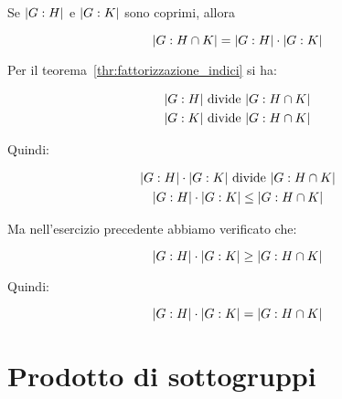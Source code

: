 \begin{teorema}
	Se $\lvert G:H \rvert$ e $\lvert G:K \rvert$ sono coprimi, allora
	
	\begin{equation}
		\lvert G:H \cap K \rvert = \lvert G:H \rvert \cdot \lvert G:K \rvert
	\end{equation}
\end{teorema}
\begin{dimostrazione}
	Per il teorema~\ref{thr:fattorizzazione_indici} si ha:
	
	\begin{gather}
		\lvert G:H \rvert \text{ divide } \lvert G:H \cap K \rvert \\
		\lvert G:K \rvert \text{ divide } \lvert G:H \cap K \rvert
	\end{gather}	

	Quindi:
	
	\begin{gather}
		\lvert G:H \rvert \cdot \lvert G:K \rvert \text{ divide } \lvert G:H \cap K \rvert \\
		\lvert G:H \rvert \cdot \lvert G:K \rvert \le \lvert G:H \cap K \rvert
	\end{gather}

	Ma nell'esercizio precedente abbiamo verificato che:
	
	\begin{equation}
		\lvert G:H \rvert \cdot \lvert G:K \rvert \ge \lvert G:H \cap K \rvert
	\end{equation}

	Quindi:
	
	\begin{equation}
		\lvert G:H \rvert \cdot \lvert G:K \rvert = \lvert G:H \cap K \rvert
	\end{equation}
\end{dimostrazione}

\section{Prodotto di sottogruppi}

